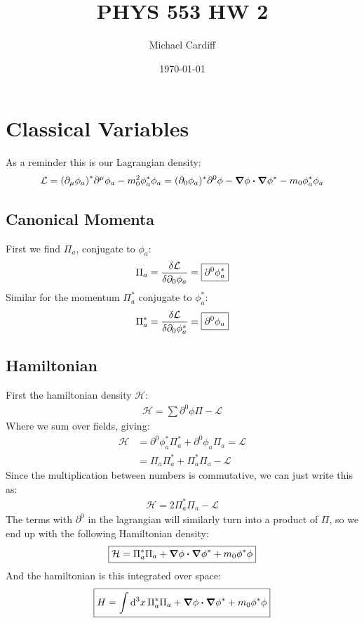 \documentclass[12pt]{article}
\title{\vspace{-3em}PHYS 553 HW 2}
\author{Michael Cardiff}
\date{\today}
\renewcommand{\L}{\mathcal{L}}
\renewcommand{\H}{\mathcal{H}}
\newcommand{\D}{\partial}
\newcommand{\phis}{\phi^*}
\begin{document}
\maketitle

\section{Classical Variables}
As a reminder this is our Lagrangian density:
\begin{align*}
  \L=\qty(\D_\mu\phi_a)^*\D^\mu\phi_a-m_0^2\phis_a\phi_a=
  (\D_0\phi_a)^*\D^0\phi - \grad{\phi}\vdot\grad{\phis}-m_0\phis_a\phi_a
\end{align*}
\subsection{Canonical Momenta}
First we find $\Pi_a$, conjugate to $\phi_a$:
\begin{align*}
  \Pi_a=\fdv{\L}{\D_0\phi_a}=\boxed{\D^0\phis_a}
\end{align*}
Similar for the momentum $\Pi^*_a$ conjugate to $\phis_a$:
\begin{align*}
  \Pi^*_a=\fdv{\L}{\D_0\phis_a}=\boxed{\D^0\phi_a}
\end{align*}
\subsection{Hamiltonian}
First the hamiltonian density $\H$:
\begin{align*}
  \H = \sum \D^0\phi\Pi - \L
\end{align*}
Where we sum over fields, giving:
\begin{align*}
  \H &=  \D^0\phis_a\Pi^*_a+\D^0\phi_a\Pi_a=\L\\
  &=\Pi_a\Pi^*_a+\Pi^*_a\Pi_a-\L
\end{align*}
Since the multiplication between numbers is commutative, we can just write this as:
\begin{align*}
  \H = 2\Pi^*_a\Pi_a-\L
\end{align*}
The terms with $\D^0$ in the lagrangian will similarly turn into a product of $\Pi$, so we end up with the following Hamiltonian density:
\begin{align*}
  \boxed{\H=\Pi^*_a\Pi_a+\grad{\phi}\vdot\grad{\phis}+m_0\phis\phi}
\end{align*}
And the hamiltonian is this integrated over space:
\begin{align*}
  \boxed{H=\int\dd[3]{x}\Pi^*_a\Pi_a+\grad{\phi}\vdot\grad{\phis}+m_0\phis\phi}
\end{align*}
\end{document}
